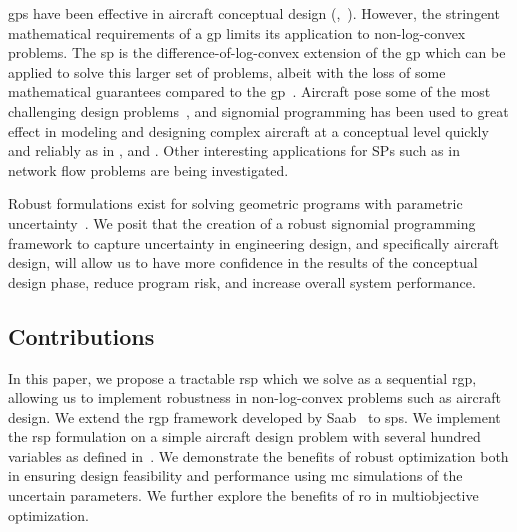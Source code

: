 \gls{gp}s have been effective in aircraft conceptual design
(\cite{Hoburg2013},~\cite{Burton2017}).
However, the stringent mathematical requirements of a \gls{gp} limits its application to non-log-convex problems.
The \gls{sp} is the difference-of-log-convex extension of the \gls{gp} which can be applied to
solve this larger set of problems, albeit with the loss of some mathematical guarantees compared to the \gls{gp}~\cite{Kirschen2018}.
Aircraft pose some of the most challenging design problems~\cite{York2018}, and signomial programming
has been used to great effect in modeling and designing complex aircraft at a conceptual level quickly
and reliably as in \cite{York2018}, \cite{Kirschen2016} and \cite{Kirschen2018}.
Other interesting applications for SPs such as in network flow problems are being investigated.

Robust formulations exist for solving geometric programs with parametric uncertainty~\cite{Saab2018}.
We posit that the creation of a robust signomial programming framework to capture uncertainty in engineering
design, and specifically aircraft design, will allow us to have more confidence in the results
of the conceptual design phase, reduce program risk, and increase overall system performance.

\subsection{Contributions}

In this paper, we propose a tractable \gls{rsp} which we solve as a sequential \gls{rgp},
allowing us to implement robustness in non-log-convex problems such as aircraft design.
We extend the \gls{rgp} framework developed by Saab~\cite{Saab2018} to \gls{sp}s.
We implement the \gls{rsp} formulation on a simple aircraft design problem with several hundred
variables as defined in~\cite{Ozturk2018}.
We demonstrate the benefits of robust optimization both in ensuring design feasibility and performance
using \gls{mc} simulations of the uncertain parameters.
We further explore the benefits of \gls{ro} in multiobjective optimization.



